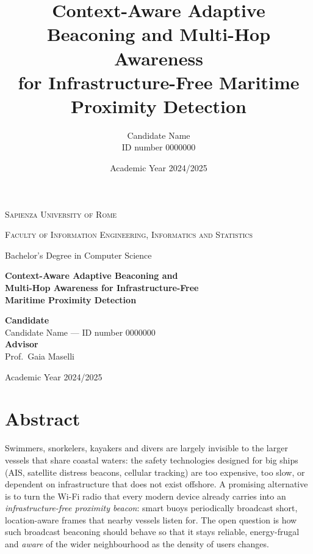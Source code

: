 \documentclass[12pt,a4paper,oneside]{report}
\title{\textbf{Context-Aware Adaptive Beaconing and Multi-Hop Awareness\\for Infrastructure-Free Maritime Proximity Detection}}
\author{Candidate Name\\\small ID number 0000000}
\date{Academic Year 2024/2025}
\begin{document}
\begin{titlepage}
\centering
{\scshape\LARGE Sapienza University of Rome \par}
\vspace{0.4cm}
{\scshape\large Faculty of Information Engineering, Informatics and Statistics \par}
{\large Bachelor's Degree in Computer Science \par}
\vfill
{\huge\bfseries Context-Aware Adaptive Beaconing and\\[0.3em] Multi-Hop Awareness for Infrastructure-Free\\[0.3em] Maritime Proximity Detection \par}
\vfill
\begin{flushleft}
\large
\textbf{Candidate}\\
Candidate Name --- ID number 0000000\\[1.2em]
\textbf{Advisor}\\
Prof.\ Gaia Maselli\\
\end{flushleft}
\vfill
{\large Academic Year 2024/2025 \par}
\end{titlepage}

\chapter*{Abstract}

Swimmers, snorkelers, kayakers and divers are largely invisible to the larger
vessels that share coastal waters: the safety technologies designed for big
ships (AIS, satellite distress beacons, cellular tracking) are too expensive,
too slow, or dependent on infrastructure that does not exist offshore. A
promising alternative is to turn the Wi-Fi radio that every modern device
already carries into an \emph{infrastructure-free proximity beacon}: smart
buoys periodically broadcast short, location-aware frames that nearby vessels
listen for. The open question is how such broadcast beaconing should behave so
that it stays reliable, energy-frugal and \emph{aware} of the wider
neighbourhood as the density of users changes.
\end{document}
